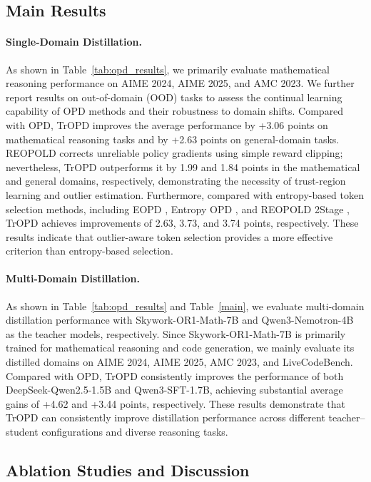 \documentclass{article} %
\renewcommand{\cite}[1]{\citep{#1}}
\begin{document}
\subsection{Main Results}

\paragraph{Single-Domain Distillation.}
As shown in Table~\ref{tab:opd_results}, we primarily evaluate mathematical reasoning performance on AIME 2024, AIME 2025, and AMC 2023. We further report results on out-of-domain (OOD) tasks to assess the continual learning capability of OPD methods and their robustness to domain shifts. Compared with OPD, TrOPD improves the average performance by +3.06 points on mathematical reasoning tasks and by +2.63 points on general-domain tasks. REOPOLD corrects unreliable policy gradients using simple reward clipping; nevertheless, TrOPD outperforms it by 1.99 and 1.84 points in the mathematical and general domains, respectively, demonstrating the necessity of trust-region learning and outlier estimation. Furthermore, compared with entropy-based token selection methods, including EOPD \cite{jin2026entropy}, Entropy OPD \cite{ko2026scaling, wang2026beyond}, and REOPOLD 2Stage \cite{ko2026scaling}, TrOPD achieves improvements of 2.63, 3.73, and 3.74 points, respectively. These results indicate that outlier-aware token selection provides a more effective criterion than entropy-based selection.


\paragraph{Multi-Domain Distillation.}
As shown in Table~\ref{tab:opd_results} and Table~\ref{main}, we evaluate multi-domain distillation performance with Skywork-OR1-Math-7B and Qwen3-Nemotron-4B as the teacher models, respectively. Since Skywork-OR1-Math-7B is primarily trained for mathematical reasoning and code generation, we mainly evaluate its distilled domains on AIME 2024, AIME 2025, AMC 2023, and LiveCodeBench. Compared with OPD, TrOPD consistently improves the performance of both DeepSeek-Qwen2.5-1.5B and Qwen3-SFT-1.7B, achieving substantial average gains of +4.62 and +3.44 points, respectively. These results demonstrate that TrOPD can consistently improve distillation performance across different teacher--student configurations and diverse reasoning tasks.



\subsection{Ablation Studies and Discussion}
\end{document}
